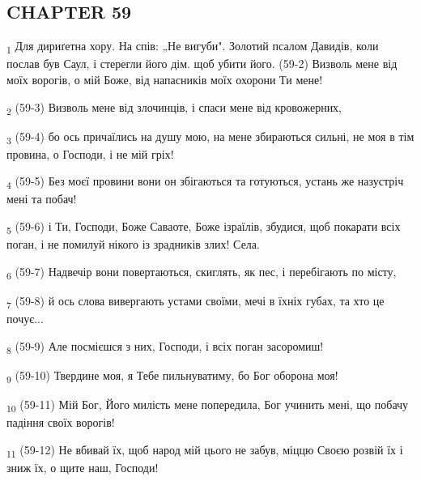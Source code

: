 \subsection{CHAPTER 59}
\begin{tcolorbox}
\textsubscript{1} Для дириґетна хору. На спів: „Не вигуби". Золотий псалом Давидів, коли послав був Саул, і стерегли його дім. щоб убити його. (59-2) Визволь мене від моїх ворогів, о мій Боже, від напасників моїх охорони Ти мене!
\end{tcolorbox}
\begin{tcolorbox}
\textsubscript{2} (59-3) Визволь мене від злочинців, і спаси мене від кровожерних,
\end{tcolorbox}
\begin{tcolorbox}
\textsubscript{3} (59-4) бо ось причаїлись на душу мою, на мене збираються сильні, не моя в тім провина, о Господи, і не мій гріх!
\end{tcolorbox}
\begin{tcolorbox}
\textsubscript{4} (59-5) Без моєї провини вони он збігаються та готуються, устань же назустріч мені та побач!
\end{tcolorbox}
\begin{tcolorbox}
\textsubscript{5} (59-6) і Ти, Господи, Боже Саваоте, Боже ізраїлів, збудися, щоб покарати всіх поган, і не помилуй нікого із зрадників злих! Села.
\end{tcolorbox}
\begin{tcolorbox}
\textsubscript{6} (59-7) Надвечір вони повертаються, скиглять, як пес, і перебігають по місту,
\end{tcolorbox}
\begin{tcolorbox}
\textsubscript{7} (59-8) й ось слова вивергають устами своїми, мечі в їхніх губах, та хто це почує...
\end{tcolorbox}
\begin{tcolorbox}
\textsubscript{8} (59-9) Але посмієшся з них, Господи, і всіх поган засоромиш!
\end{tcolorbox}
\begin{tcolorbox}
\textsubscript{9} (59-10) Твердине моя, я Тебе пильнуватиму, бо Бог оборона моя!
\end{tcolorbox}
\begin{tcolorbox}
\textsubscript{10} (59-11) Мій Бог, Його милість мене попередила, Бог учинить мені, що побачу падіння своїх ворогів!
\end{tcolorbox}
\begin{tcolorbox}
\textsubscript{11} (59-12) Не вбивай їх, щоб народ мій цього не забув, міццю Своєю розвій їх і зниж їх, о щите наш, Господи!
\end{tcolorbox}
